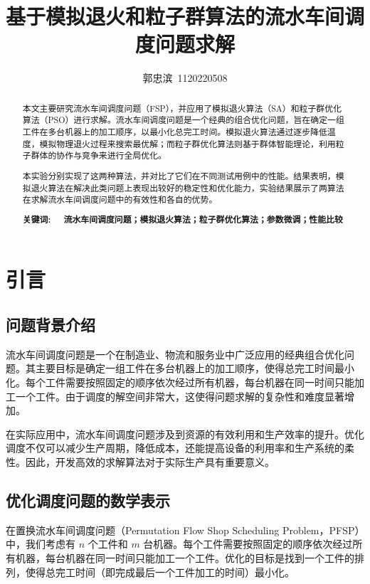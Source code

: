 \documentclass[12pt]{article}
\title{\textbf{\Large 基于模拟退火和粒子群算法的流水车间调度问题求解}  \\[2ex]}
\author{郭忠滨~1120220508}
\date{}
\begin{document}
	
	\maketitle
	\begin{abstract}
		本文主要研究流水车间调度问题（FSP），并应用了模拟退火算法（SA）和粒子群优化算法（PSO）进行求解。流水车间调度问题是一个经典的组合优化问题，旨在确定一组工件在多台机器上的加工顺序，以最小化总完工时间。模拟退火算法通过逐步降低温度，模拟物理退火过程来搜索最优解；而粒子群优化算法则基于群体智能理论，利用粒子群体的协作与竞争来进行全局优化。
		
		本实验分别实现了这两种算法，并对比了它们在不同测试用例中的性能。结果表明，模拟退火算法在解决此类问题上表现出较好的稳定性和优化能力，实验结果展示了两算法在求解流水车间调度问题中的有效性和各自的优势。
		\newline
		
		\noindent\textbf{关键词: ~~流水车间调度问题；模拟退火算法；粒子群优化算法；参数微调；性能比较}
	\end{abstract}
	
	\section{引言}
	
	\subsection{问题背景介绍}
	
	流水车间调度问题是一个在制造业、物流和服务业中广泛应用的经典组合优化问题\cite{ref2}。其主要目标是确定一组工件在多台机器上的加工顺序，使得总完工时间最小化。每个工件需要按照固定的顺序依次经过所有机器，每台机器在同一时间只能加工一个工件。由于调度的解空间非常大，这使得问题求解的复杂性和难度显著增加。
	
	在实际应用中，流水车间调度问题涉及到资源的有效利用和生产效率的提升。优化调度不仅可以减少生产周期，降低成本，还能提高设备的利用率和生产系统的柔性。因此，开发高效的求解算法对于实际生产具有重要意义。
	
	\subsection{优化调度问题的数学表示}
	
	在置换流水车间调度问题（Permutation Flow Shop Scheduling Problem，PFSP）中，我们考虑有 \( n \) 个工件和 \( m \) 台机器。每个工件需要按照固定的顺序依次经过所有机器，每台机器在同一时间只能加工一个工件。优化的目标是找到一个工件的排列，使得总完工时间（即完成最后一个工件加工的时间）最小化。
	
\end{document}
